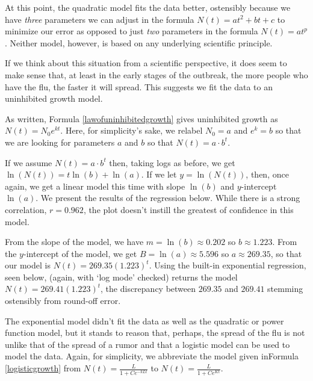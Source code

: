 \documentclass{ximera}
\begin{document}
 

At this point, the quadratic model fits the data better, ostensibly because we have \textit{three} parameters we can adjust in the formula $N(t) = at^2+bt+c$ to minimize our error as opposed to just \textit{two} parameters in the formula $N(t) = a t^{p}$.  Neither  model, however, is based on any underlying scientific principle.

 

If we think about this situation from a scientific perspective, it does seem to make sense that, at least in the early stages of the outbreak, the more people who have the flu, the faster it will spread.  This suggests we fit the data to an uninhibited growth model.


As  written,  Formula \ref{lawofuninhibitedgrowth} gives uninhibited growth as  $N(t) = N_0e^{kt}$. Here, for simplicity's sake, we relabel $N_0 = a$ and $e^{k} = b$ so that we are looking for parameters $a$ and $b$ so that $N(t) = a \cdot b^{t}$.

 
\label{swineflulinearized}
If we assume $N(t) = a \cdot b^{t}$ then, taking logs as before, we get $\ln(N(t)) = t \ln(b) + \ln(a)$. If we let $y= \ln(N(t))$, then, once again, we get a linear model this time with slope $\ln(b)$ and $y$-intercept $\ln(a)$.  We present the results of the regression below.  While there is a strong correlation, $r = 0.962$, the plot doesn't instill the greatest of confidence in this model.

\begin{center}
\end{center}

From the slope of the model, we have   $m = \ln(b) \approx 0.202$  so $b \approx 1.223$.  From the $y$-intercept of the model, we get $B = \ln(a) \approx  5.596$ so $a \approx 269.35$, so that our model is $N(t) = 269.35(1.223)^{t}$. Using the built-in exponential regression, seen below,  (again, with `log mode' checked) returns the model  $N(t) = 269.41 (1.223)^{t}$, the discrepancy between   $269.35$ and $269.41$ stemming ostensibly from round-off error.    

\begin{center}
\end{center}


The exponential model didn't fit the data as well as the quadratic or power function model, but it stands to reason that, perhaps, the spread of the flu is not unlike that of the spread of a rumor and that a logistic model can be used to model the data.  Again, for simplicity, we abbreviate the model given inFormula \ref{logisticgrowth} from $N(t) =\frac{L}{1 + Ce^{-kLt}}$ to $N(t) = \frac{L}{1 + Ce^{Kt}}$.
\end{document}

